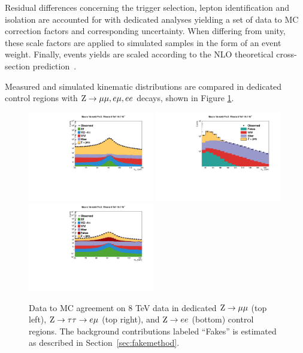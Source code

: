 Residual differences concerning the trigger selection, lepton identification and isolation are accounted for with dedicated analyses yielding a set of data to MC correction factors and corresponding uncertainty. When differing from unity, these scale factors are applied to simulated samples in the form of an event weight.
Finally, events yields are scaled according to the NLO theoretical cross-section prediction~\cite{MCFM}. 

Measured and simulated kinematic distributions are compared in dedicated control regions with $\mathrm{Z}\rightarrow\mu\mu,e\mu,ee$ decays, shown in Figure \ref{fig:(dis)agreement}. %

\begin{figure}
\centering
\includegraphics[width=0.49\textwidth]{4_Analisys/pics/8TeV/plots/zmm/mass_rebin_log.pdf}
\includegraphics[width=0.49\textwidth]{4_Analisys/pics/8TeV/plots/em/mass_rebin_log-fakes.pdf}\\
\includegraphics[width=0.49\textwidth]{4_Analisys/pics/8TeV/plots/zee/mass_wfakes_log.pdf}
\caption{Data to MC agreement on 8 TeV data in dedicated $\mathrm{Z}\rightarrow\mu\mu$ (top left), $\mathrm{Z}\rightarrow \tau\tau \rightarrow e\mu$ (top right), and $\mathrm{Z}\rightarrow ee$ (bottom) control regions. The background contributions labeled ``Fakes'' is estimated as described in Section~\ref{sec:fakemethod}. %
}
\label{fig:(dis)agreement}
\end{figure}

